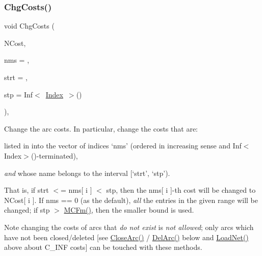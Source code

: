\mbox{\label{class_s_p_tree_a8f213278dffbfd9008e7c175951c1d89}} 
\subsubsection{\texorpdfstring{Chg\+Costs()}{ChgCosts()}}
{\footnotesize\ttfamily void Chg\+Costs (\begin{DoxyParamCaption}\item[{\mbox{\hyperlink{class_m_c_f_class_ab700102e9ba8bb6015be6818d4e99097}{c\+C\+Row}}}]{N\+Cost,  }\item[{\mbox{\hyperlink{class_m_c_f_class_a81575b2d4e4d5636b17170432150ae69}{c\+Index\+\_\+\+Set}}}]{nms = {},  }\item[{\mbox{\hyperlink{class_m_c_f_class_a76aaabb20535c51a2752b93f6c38fe54}{c\+Index}}}]{strt = {},  }\item[{\mbox{\hyperlink{class_m_c_f_class_ad53d6229d7ec28555a9c9c2fd9abf773}{Index}}}]{stp = {\ttfamily Inf$<$~\mbox{\hyperlink{class_m_c_f_class_ad53d6229d7ec28555a9c9c2fd9abf773}{Index}}~$>$()} }\end{DoxyParamCaption})\hspace{0.3cm}{\ttfamily [override]}, {\ttfamily [virtual]}}

Change the arc costs. In particular, change the costs that are\+:


\begin{DoxyItemize}
\item listed in into the vector of indices `nms' (ordered in increasing sense and Inf$<$\+Index$>$()-\/terminated),
\item {\itshape and} whose name belongs to the interval \mbox{[}`strt', `stp').
\end{DoxyItemize}

That is, if strt $<$= nms\mbox{[} i \mbox{]} $<$ stp, then the nms\mbox{[} i \mbox{]}-\/th cost will be changed to N\+Cost\mbox{[} i \mbox{]}. If nms == 0 (as the default), {\itshape all} the entries in the given range will be changed; if stp $>$ \mbox{\hyperlink{class_m_c_f_class_ab4d5a0d0fc49882de0b4eb3146f1b7a6}{M\+C\+Fm()}}, then the smaller bound is used.

\begin{DoxyNote}{Note}
changing the costs of arcs that {\itshape do not exist} is {\itshape not allowed}; only arcs which have not been closed/deleted \mbox{[}see \mbox{\hyperlink{class_s_p_tree_a4a964ce79159307998f5acd0018d01b1}{Close\+Arc()}} / \mbox{\hyperlink{class_s_p_tree_a3b6145c95b83f40a76d724eb2b92f80f}{Del\+Arc()}} below and \mbox{\hyperlink{class_s_p_tree_afbfa5c036f9ea67e35005ec77b82214a}{Load\+Net()}} above about C\+\_\+\+I\+NF costs\mbox{]} can be touched with these methods. 
\end{DoxyNote}


